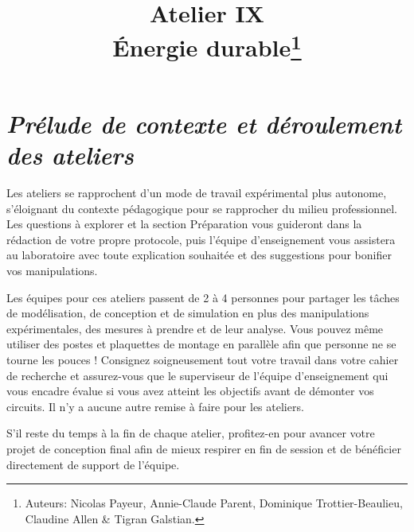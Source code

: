 \documentclass[canadien,12pt,oneside,letterpaper]{article}
\title{\textbf{Atelier IX}\\Énergie durable\thanks{Auteurs: Nicolas Payeur, Annie-Claude Parent, Dominique Trottier-Beaulieu, Claudine Allen \& Tigran Galstian.}}
\date{}
\begin{document}
\maketitle \vspace{-17ex}
\section{\textit{\textbf{Prélude de contexte et déroulement des ateliers}}}
\vspace{-2ex}
Les ateliers se rapprochent d’un mode de travail expérimental plus autonome,
s’éloignant du contexte pédagogique pour se rapprocher du milieu professionnel. Les questions à explorer et la section Préparation vous guideront dans la rédaction de votre propre protocole, puis l’équipe d’enseignement vous assistera au laboratoire avec toute explication souhaitée et des suggestions pour bonifier vos manipulations. 

Les équipes pour ces ateliers passent de 2 à 4 personnes pour partager les tâches de modélisation, de conception et de simulation en plus des manipulations expérimentales, des mesures à prendre et de leur analyse. Vous pouvez même utiliser des postes et plaquettes de montage en parallèle afin que personne ne se tourne les pouces ! Consignez soigneusement tout votre travail dans votre cahier
de recherche et assurez-vous que le superviseur de l’équipe d’enseignement qui vous
encadre évalue si vous avez atteint les objectifs avant de démonter vos circuits. Il
n’y a aucune autre remise à faire pour les ateliers.

S’il reste du temps à la fin de chaque atelier, profitez-en pour
avancer votre projet de conception final afin de mieux respirer en fin de session et
de bénéficier directement de support de l’équipe.
\end{document}
